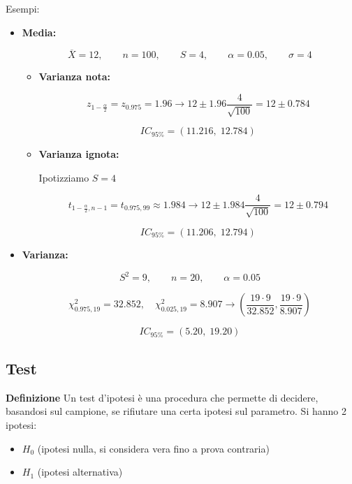 \documentclass{article}
\newcommand{\df}{\noindent\textbf{Definizione} }
\begin{document}
Esempi:
\begin{itemize}

    \item \textbf{Media:}

    \[
        \overline{X}=12,\qquad n=100,\qquad S=4,\qquad \alpha=0.05,\qquad \sigma=4
    \]

    \begin{itemize}

    \item \textbf{Varianza nota:}

    \[
    z_{1-\frac{\alpha}{2}}=z_{0.975}=1.96\rightarrow
    12\pm1.96\frac{4}{\sqrt{100}}
    =
    12\pm0.784
    \]

    \[
    IC_{95\%}=(11.216,\;12.784)
    \]


    \item \textbf{Varianza ignota:}

    Ipotizziamo $S=4$

    \[
    t_{1-\frac{\alpha}{2},n-1}
    =
    t_{0.975,99}
    \approx1.984\rightarrow
    12\pm1.984\frac{4}{\sqrt{100}}
    =
    12\pm0.794
    \]

    \[
    IC_{95\%}=(11.206,\;12.794)
    \]

    \end{itemize}


    \item \textbf{Varianza:}

    \[
    S^2=9,\qquad n=20,\qquad \alpha=0.05
    \]

    \[
    \chi^2_{0.975,19}=32.852,
    \quad
    \chi^2_{0.025,19}=8.907\rightarrow
    \left(
    \frac{19\cdot9}{32.852},
    \frac{19\cdot9}{8.907}
    \right)
    \]

    \[
    IC_{95\%}=(5.20,\;19.20)
    \]

\end{itemize}

\subsection{Test}

\df Un test d'ipotesi è una procedura che permette di decidere, basandosi sul campione, se rifiutare una certa ipotesi sul parametro. Si hanno 2 ipotesi:
\begin{itemize}
    \item $H_0$ (ipotesi nulla, si considera vera fino a prova contraria)
    
    \item $H_1$ (ipotesi alternativa)
    
\end{itemize}
\end{document}
